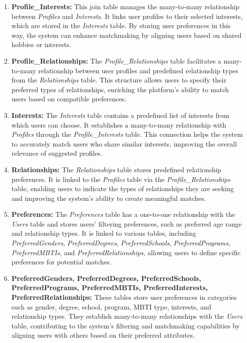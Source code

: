 \begin{enumerate}
            \item \textbf{Profile\_Interests:} This join table manages the many-to-many relationship between \textit{Profiles} and \textit{Interests}. It links user profiles to their selected interests, which are stored in the \textit{Interests} table. By storing user preferences in this way, the system can enhance matchmaking by aligning users based on shared hobbies or interests.
        
            \item \textbf{Profile\_Relationships:} The \textit{Profile\_Relationships} table facilitates a many-to-many relationship between user profiles and predefined relationship types from the \textit{Relationships} table. This structure allows users to specify their preferred types of relationships, enriching the platform's ability to match users based on compatible preferences.
        
            \item \textbf{Interests:} The \textit{Interests} table contains a predefined list of interests from which users can choose. It establishes a many-to-many relationship with \textit{Profiles} through the \textit{Profile\_Interests} table. This connection helps the system to accurately match users who share similar interests, improving the overall relevance of suggested profiles.
        
            \item \textbf{Relationships:} The \textit{Relationships} table stores predefined relationship preferences. It is linked to the \textit{Profiles} table via the \textit{Profile\_Relationships} table, enabling users to indicate the types of relationships they are seeking and improving the system’s ability to create meaningful matches.
        
            \item \textbf{Preferences:} The \textit{Preferences} table has a one-to-one relationship with the \textit{Users} table and stores users' filtering preferences, such as preferred age range and relationship types. It is linked to various tables, including \textit{PreferredGenders}, \textit{PreferredDegrees}, \textit{PreferredSchools}, \textit{PreferredPrograms}, \textit{PreferredMBTIs}, and \textit{PreferredRelationships}, allowing users to define specific preferences for potential matches.
            
            \item \textbf{PreferredGenders, PreferredDegrees, PreferredSchools, PreferredPrograms, PreferredMBTIs, PreferredInterests, PreferredRelationships:} These tables store user preferences in categories such as gender, degree, school, program, MBTI type, interests, and relationship types. They establish many-to-many relationships with the \textit{Users} table, contributing to the system’s filtering and matchmaking capabilities by aligning users with others based on their preferred attributes.
        

\end{enumerate}
